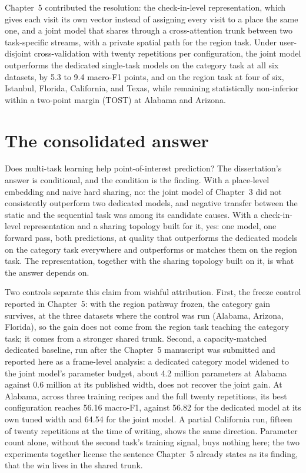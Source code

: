 Chapter~5 contributed the resolution: the check-in-level representation, which gives
each visit its own vector instead of assigning every visit to a place the same one,
and a joint model that shares through a cross-attention trunk between two
task-specific streams, with a private spatial path for the region task. Under
user-disjoint cross-validation with twenty repetitions per configuration, the joint
model outperforms the dedicated single-task models on the category task at all six
datasets, by 5.3 to 9.4 macro-F1 points, and on the region task at four of six,
Istanbul, Florida, California, and Texas, while remaining statistically non-inferior
within a two-point margin (TOST) at Alabama and Arizona.

\section{The consolidated answer}
\label{sec:conc:answer}

Does multi-task learning help point-of-interest prediction? The dissertation's answer
is conditional, and the condition is the finding. With a place-level embedding and
naive hard sharing, no: the joint model of Chapter~3 did not consistently outperform
two dedicated models, and negative transfer between the static and the sequential
task was among its candidate causes. With a check-in-level representation and a
sharing topology built for it, yes: one model, one forward pass, both predictions, at
quality that outperforms the dedicated models on the category task everywhere and
outperforms or matches them on the region task. The representation, together with the
sharing topology built on it, is what the answer depends on.

Two controls separate this claim from wishful attribution. First, the freeze control
reported in Chapter~5: with the region pathway frozen, the category gain survives, at
the three datasets where the control was run (Alabama, Arizona, Florida), so the gain
does not come from the region task teaching the category task; it comes from a
stronger shared trunk. Second, a capacity-matched dedicated baseline, run after the
Chapter~5 manuscript was submitted and reported here as a frame-level analysis: a
dedicated category model widened to the joint model's parameter budget, about 4.2
million parameters at Alabama against 0.6 million at its published width, does not
recover the joint gain. At Alabama, across three training recipes and the full twenty
repetitions, its best configuration reaches 56.16 macro-F1, against 56.82 for the
dedicated model at its own tuned width and 64.54 for the joint model. A partial
California run, fifteen of twenty repetitions at the time of writing, shows the same
direction. Parameter count alone, without the second task's training signal, buys
nothing here; the two experiments together license the sentence Chapter~5 already
states as its finding, that the win lives in the shared trunk.

